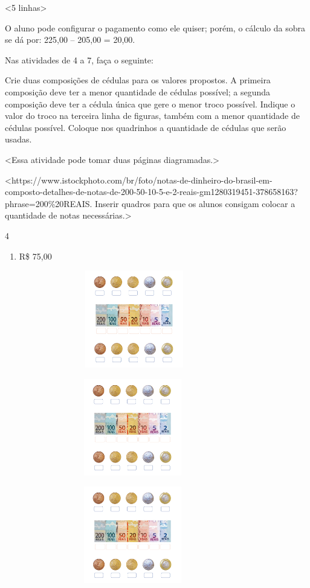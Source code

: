{{{{{{{{{\textless{}5 linhas\textgreater{}

O aluno pode configurar o pagamento como ele quiser; porém, o cálculo da
sobra se dá por: 225,00 -- 205,00 = 20,00.

Nas atividades de 4 a 7, faça o seguinte:

Crie duas composições de cédulas para os valores propostos. A primeira composição deve ter a menor quantidade de cédulas possível; a segunda
composição deve ter a cédula única que gere o menor troco possível.
Indique o valor do troco na terceira linha de figuras, também com a
menor quantidade de cédulas possível. Coloque nos quadrinhos a
quantidade de cédulas que serão usadas. 

\textless{}Essa atividade pode
tomar duas páginas diagramadas.\textgreater{}

\textless{}https://www.istockphoto.com/br/foto/notas-de-dinheiro-do-brasil-em-composto-detalhes-de-notas-de-200-50-10-5-e-2-reais-gm1280319451-378658163?phrase=200\%20REAIS.
Inserir quadros para que os alunos consigam colocar a quantidade de
notas necessárias.\textgreater{}

\num{4}


\begin{enumerate}
\def\labelenumi{\alph{enumi})}
\item
  R\$ 75,00
\end{enumerate}

\includegraphics[width=4.45833in,height=1.68116in]{media/image72.png}

\includegraphics[width=4.40625in,height=1.66152in]{media/image72.png}

\includegraphics[width=4.40625in,height=1.66152in]{media/image72.png}

}}}}}}}}}
